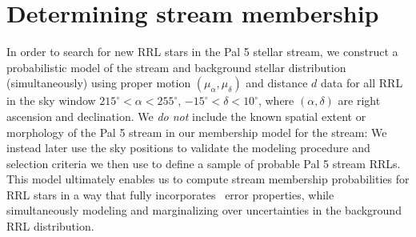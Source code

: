 \documentclass[twocolumn]{aastex63}
\begin{document}




\section{Determining stream membership} \label{sec:membership}

In order to search for new RRL stars in the Pal 5 stellar stream, we construct a probabilistic model of the stream and background stellar distribution (simultaneously) using proper motion $(\mu_\alpha, \mu_\delta)$ and distance $d$ data for all RRL in the sky window $215^\circ < \alpha < 255^\circ$, $-15^\circ < \delta < 10^\circ$, where $(\alpha, \delta)$ are right ascension and declination.
We \emph{do not} include the known spatial extent or morphology of the Pal 5 stream in our membership model for the stream: We instead later use the sky positions to validate the modeling procedure and selection criteria we then use to define a sample of probable Pal 5 stream RRLs.
This model ultimately enables us to compute stream membership probabilities for RRL stars in a way that fully incorporates \Gaia\ error properties, while simultaneously modeling and marginalizing over uncertainties in the background RRL distribution.
\end{document}
